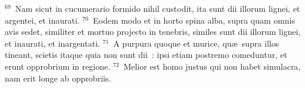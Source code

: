 ${}^{69}$~Nam sicut in cucumerario formido nihil custodit, ita sunt dii illorum lignei, et argentei, et inaurati.
${}^{70}$~Eodem modo et in horto spina alba, supra quam omnis avis sedet, similiter et mortuo projecto in tenebris, similes sunt dii illorum lignei, et inaurati, et inargentati.
${}^{71}$~A purpura quoque et murice, qu\ae\ supra illos tineant, scietis itaque quia non sunt dii~: ipsi etiam postremo comeduntur, et erunt opprobrium in regione.
${}^{72}$~Melior est homo justus qui non habet simulacra, nam erit longe ab opprobriis.
